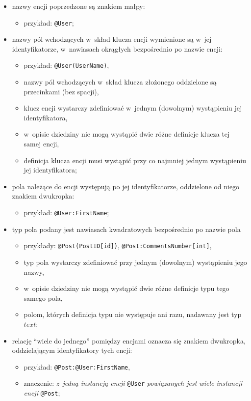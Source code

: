 \begin{itemize}
 \item nazwy encji poprzedzone są znakiem małpy:
  \begin{itemize}
   \item przykład: \verb|@User|;
  \end{itemize}
  
 \item nazwy pól wchodzących w~skład klucza encji wymienione są w~jej identyfikatorze, w~nawiasach okrągłych bezpośrednio po nazwie encji:
  \begin{itemize}
   \item przykład: \verb|@User(UserName)|,
   \item nazwy pól wchodzących w~skład klucza złożonego oddzielone są przecinkami (bez spacji),
   \item klucz encji wystarczy zdefiniować w~jednym (dowolnym) wystąpieniu jej identyfikatora,
   \item w~opisie dziedziny nie mogą wystąpić dwie różne definicje klucza tej samej encji,
   \item definicja klucza encji musi wystąpić przy co najmniej jednym wystąpieniu jej identyfikatora;
  \end{itemize}
 
 \item pola należące do encji występują po jej identyfikatorze, oddzielone od niego znakiem dwukropka:
  \begin{itemize}
   \item przykład: \verb|@User:FirstName|;
  \end{itemize}
  
 \item typ pola podany jest nawiasach kwadratowych bezpośrednio po nazwie pola
  \begin{itemize}
   \item przykłady: \verb|@Post(PostID[id])|, \verb|@Post:CommentsNumber[int]|,
   \item typ pola wystarczy zdefiniować przy jednym (dowolnym) wystąpieniu jego nazwy,
   \item w~opisie dziedziny nie mogą wystąpić dwie różne definicje typu tego samego pola,
   \item polom, których definicja typu nie występuje ani razu, nadawany jest typ $text$;
  \end{itemize}
 
 \item relację ``wiele do jednego'' pomiędzy encjami oznacza się znakiem dwukropka, oddzielającym identyfikatory tych encji:
  \begin{itemize}
   \item przykład: \verb|@Post:@User:FirstName|,
   \item znaczenie: \emph{z~jedną instancją encji} \verb|@User| \emph{powiązanych jest wiele instancji encji} \verb|@Post|;
  \end{itemize}
 

\end{itemize}
